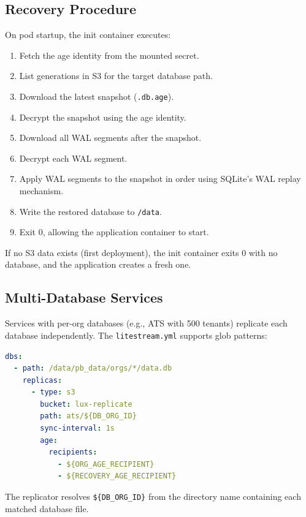 \subsection{Recovery Procedure}\label{sec:recovery}

On pod startup, the init container executes:

\begin{enumerate}[nosep]
  \item Fetch the age identity from the mounted secret.
  \item List generations in S3 for the target database path.
  \item Download the latest snapshot (\texttt{.db.age}).
  \item Decrypt the snapshot using the age identity.
  \item Download all WAL segments after the snapshot.
  \item Decrypt each WAL segment.
  \item Apply WAL segments to the snapshot in order using SQLite's
    WAL replay mechanism.
  \item Write the restored database to \texttt{/data}.
  \item Exit 0, allowing the application container to start.
\end{enumerate}

If no S3 data exists (first deployment), the init container exits 0
with no database, and the application creates a fresh one.

\subsection{Multi-Database Services}\label{sec:multidb}

Services with per-org databases (e.g., ATS with 500 tenants) replicate
each database independently. The \texttt{litestream.yml} supports
glob patterns:

\begin{lstlisting}[language=YAML,caption={Multi-database replication.}]
dbs:
  - path: /data/pb_data/orgs/*/data.db
    replicas:
      - type: s3
        bucket: lux-replicate
        path: ats/${DB_ORG_ID}
        sync-interval: 1s
        age:
          recipients:
            - ${ORG_AGE_RECIPIENT}
            - ${RECOVERY_AGE_RECIPIENT}
\end{lstlisting}

The replicator resolves \texttt{\$\{DB\_ORG\_ID\}} from the directory
name containing each matched database file.

